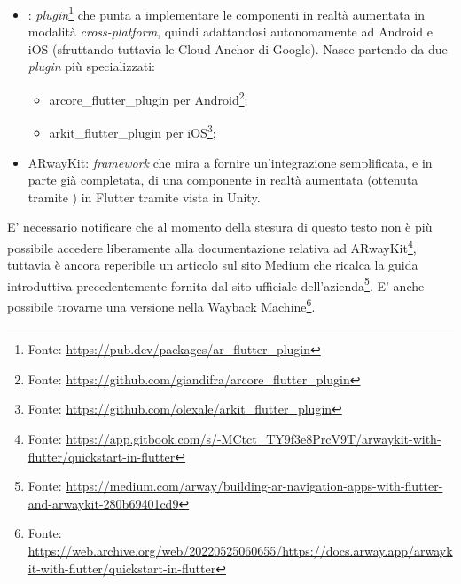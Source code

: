 \begin{itemize}
    \item \aplug{}: \textit{plugin}\footnote{Fonte: \url{https://pub.dev/packages/ar_flutter_plugin}} che punta a implementare le componenti in realtà aumentata in modalità \textit{cross-platform}, quindi adattandosi autonomamente ad Android e iOS (sfruttando tuttavia le Cloud Anchor di Google). Nasce partendo da due \textit{plugin} più specializzati: 
    \begin{itemize}
        \item arcore\_flutter\_plugin per Android\footnote{Fonte: \url{https://github.com/giandifra/arcore_flutter_plugin}};
        \item arkit\_flutter\_plugin per iOS\footnote{Fonte: \url{https://github.com/olexale/arkit_flutter_plugin}};
    \end{itemize}
    \item ARwayKit: \textit{framework} che mira a fornire un'integrazione semplificata, e in parte già completata, di una componente in realtà aumentata (ottenuta tramite \asa{}) in Flutter tramite vista in Unity.
\end{itemize}

E' necessario notificare che al momento della stesura di questo testo non è più possibile accedere liberamente alla documentazione relativa ad ARwayKit\footnote{Fonte: \url{https://app.gitbook.com/s/-MCtct_TY9f3e8PrcV9T/arwaykit-with-flutter/quickstart-in-flutter}}, tuttavia è ancora reperibile un articolo sul sito Medium che ricalca la guida introduttiva precedentemente fornita dal sito ufficiale dell'azienda\footnote{Fonte: \url{https://medium.com/arway/building-ar-navigation-apps-with-flutter-and-arwaykit-280b69401cd9}}. 
E' anche possibile trovarne una versione nella Wayback Machine\footnote{Fonte: \url{https://web.archive.org/web/20220525060655/https://docs.arway.app/arwaykit-with-flutter/quickstart-in-flutter}}.

